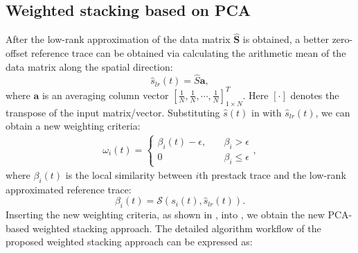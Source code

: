 \subsection{Weighted stacking based on PCA} 
After the low-rank approximation of the data matrix $\hat{\mathbf{S}}$ is obtained, a better zero-offset reference trace can be obtained via calculating the arithmetic mean of the data matrix along the spatial direction:
 \begin{equation}
 \label{eq:ave}
\hat{s}_{lr}(t)= \hat{S}\mathbf{a},
 \end{equation}
 where $\mathbf{a}$ is an averaging column vector $[\frac{1}{N},\frac{1}{N},\cdots,\frac{1}{N}]_{1\times N}^T$. Here $[\cdot]$ denotes the transpose of the input matrix/vector.
Substituting $\hat{s}(t)$ in \wen{(\ref{eq:eta})} with $\hat{s}_{lr}(t)$, we can obtain a new weighting criteria:
\begin{align}
\label{eq:weight1}
\omega_i(t)=\left\{\begin{array}{cl}
\beta_{i}(t)-\epsilon, & \quad \beta_i>\epsilon \\
0 & \quad \beta_i \le \epsilon
\end{array},\right.
\end{align}
where $\beta_i(t)$ is the local similarity between $i$th prestack trace and the low-rank approximated reference trace:
\begin{equation}
\label{eq:beta}
\beta_i(t) = \mathcal{S}(s_i(t),\hat{s}_{lr}(t)).
\end{equation}
Inserting the new weighting criteria, as shown in \wen{(\ref{eq:weight1})}, into \wen{(\ref{eq:simistack})}, we obtain the new PCA-based weighted stacking approach. The detailed algorithm workflow of the proposed weighted stacking approach can be expressed as:

